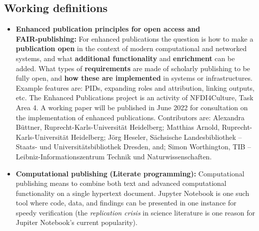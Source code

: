 \documentclass{article}
\begin{document}
\subsection{Working definitions}\label{H6504202}


\begin{itemize}
\item \textbf{Enhanced publication principles for open access and FAIR‑publishing}\textbf{:}\protect\footnotemark{} For enhanced publications the question is how to make a \textbf{publication open} in the context of modern computational and networked systems, and what \textbf{additional functionality} and \textbf{enrichment} can be added. What types of \textbf{requirements }are made of scholarly publishing to be fully open, and \textbf{how these are implemented }in systems or infrastructures. Example features are: PIDs, expanding roles and attribution, linking outputs, etc. The Enhanced Publications project is an activity of NFDI4Culture, Task Area 4. A working paper will be published in June 2022 for consultation on the implementation of enhanced publications. Contributors are: Alexandra Büttner, Ruprecht-Karls-Universität Heidelberg; Matthias Arnold, Ruprecht-Karls-Universität Heidelberg; Jörg Heseler, Sächsische Landesbibliothek – Staats- und Universitätsbibliothek Dresden, and; Simon Worthington, TIB – Leibniz-Informationszentrum Technik und Naturwissenschaften.


\item \textbf{Computational publishing}\textbf{ (Literate programming): }\autocite{KnuthDonald1992} Computational publishing means to combine both text and advanced computational functionality on a single hypertext document. Jupyter Notebook is one such tool where code, data, and findings can be presented in one instance for speedy verification (the \emph{replication crisis} in science literature is one reason for Jupiter Notebook's current popularity).



\end{itemize}
\end{document}

